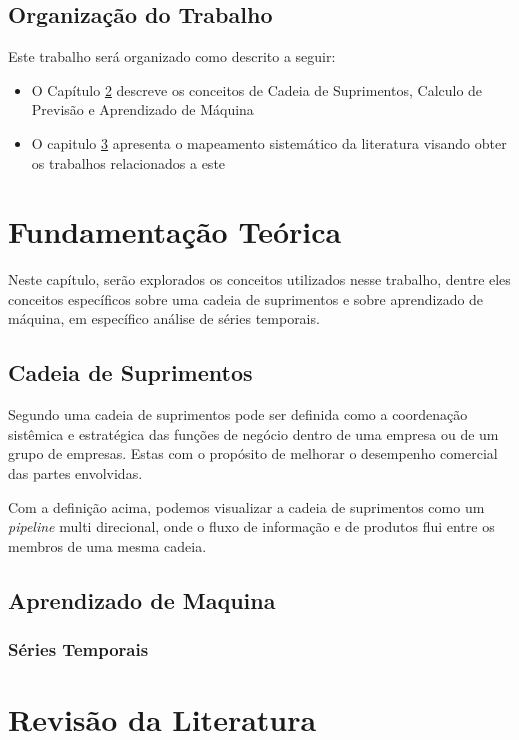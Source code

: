 \section{Organização do Trabalho}
Este trabalho será organizado como descrito a seguir:
\begin{itemize}
\item{O Capítulo \ref{theory} descreve os conceitos de Cadeia de Suprimentos, Calculo de Previsão e Aprendizado de Máquina}
\item{O capitulo \ref{revision} apresenta o mapeamento sistemático da literatura visando obter os trabalhos relacionados a este}
\end{itemize}

\chapter{Fundamentação Teórica}\label{theory}

Neste capítulo, serão explorados os conceitos utilizados nesse trabalho, dentre eles conceitos específicos sobre uma cadeia de suprimentos  e sobre aprendizado de máquina, em específico análise de séries temporais.

\section{Cadeia de Suprimentos}
Segundo \citep{mentzer2001defining} uma cadeia de suprimentos pode ser definida como  a coordenação sistêmica e estratégica  das funções de negócio dentro de uma empresa ou de um grupo de empresas. Estas com o propósito de melhorar o desempenho comercial das partes envolvidas.

Com a definição acima, podemos visualizar a cadeia de suprimentos como um \textit{pipeline} multi direcional, onde o fluxo de informação e de produtos flui entre os membros de uma mesma cadeia.

\section{Aprendizado de Maquina}

\subsection{Séries Temporais}


\chapter{Revisão da Literatura} \label{revision}




